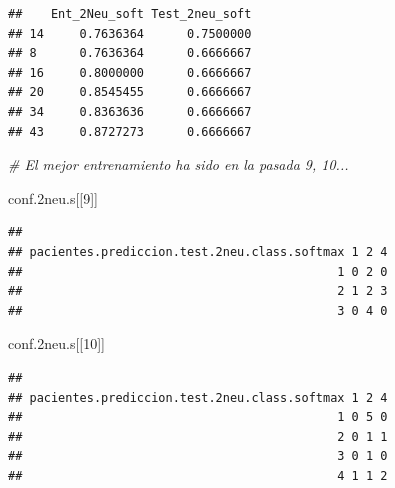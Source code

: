\documentclass[]{article}
\newenvironment{Shaded}{\begin{snugshade}}{\end{snugshade}}
\newcommand{\CommentTok}[1]{\textcolor[rgb]{0.56,0.35,0.01}{\textit{#1}}}
\newcommand{\DataTypeTok}[1]{\textcolor[rgb]{0.13,0.29,0.53}{#1}}
\newcommand{\DecValTok}[1]{\textcolor[rgb]{0.00,0.00,0.81}{#1}}
\newcommand{\FloatTok}[1]{\textcolor[rgb]{0.00,0.00,0.81}{#1}}
\newcommand{\KeywordTok}[1]{\textcolor[rgb]{0.13,0.29,0.53}{\textbf{#1}}}
\newcommand{\NormalTok}[1]{#1}
\newcommand{\OperatorTok}[1]{\textcolor[rgb]{0.81,0.36,0.00}{\textbf{#1}}}
\newcommand{\StringTok}[1]{\textcolor[rgb]{0.31,0.60,0.02}{#1}}
\begin{document}
\begin{Shaded}
\end{Shaded}

\begin{verbatim}
##    Ent_2Neu_soft Test_2neu_soft
## 14     0.7636364      0.7500000
## 8      0.7636364      0.6666667
## 16     0.8000000      0.6666667
## 20     0.8545455      0.6666667
## 34     0.8363636      0.6666667
## 43     0.8727273      0.6666667
\end{verbatim}

\begin{Shaded}
\begin{Highlighting}[]
\CommentTok{# El mejor entrenamiento ha sido en la pasada 9, 10...}

\NormalTok{conf}\FloatTok{.2}\NormalTok{neu.s[[}\DecValTok{9}\NormalTok{]]}
\end{Highlighting}
\end{Shaded}

\begin{verbatim}
##                                             
## pacientes.prediccion.test.2neu.class.softmax 1 2 4
##                                            1 0 2 0
##                                            2 1 2 3
##                                            3 0 4 0
\end{verbatim}

\begin{Shaded}
\begin{Highlighting}[]
\NormalTok{conf}\FloatTok{.2}\NormalTok{neu.s[[}\DecValTok{10}\NormalTok{]]}
\end{Highlighting}
\end{Shaded}

\begin{verbatim}
##                                             
## pacientes.prediccion.test.2neu.class.softmax 1 2 4
##                                            1 0 5 0
##                                            2 0 1 1
##                                            3 0 1 0
##                                            4 1 1 2
\end{verbatim}
\end{document}

